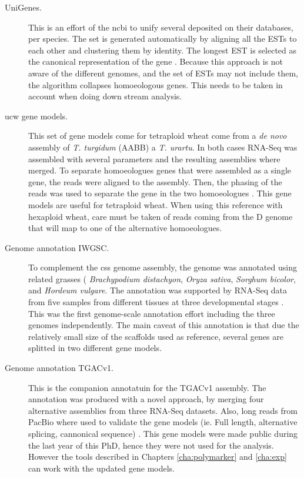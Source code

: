 \begin{description}
\item[UniGenes.] This is an effort of the \gls{ncbi} to unify several  deposited on their databases, per species.
The set is generated automatically by aligning all the ESTs to each other and clustering them by identity. 
The longest EST is selected as the canonical representation of the gene \citep{PontiusJUWagnerL2002}. 
Because this approach is not aware of the different genomes, and the set of ESTs may not include them, the algorithm  collapses homoeologous genes. 
This needs to be taken in account when doing down stream analysis. 
\item[\acrshort{ucw} gene models.] This set of gene models come for tetraploid wheat come from a \textit{de novo} assembly of \textit{T. turgidum} (AABB) a \textit{T. urartu}. 
In both cases RNA-Seq was assembled with several parameters and the resulting assemblies where merged. 
To separate homoeologues genes that were assembled as a single gene, the reads were aligned to the assembly.
Then, the phasing of the reads was used to separate the gene in the two homoeologues \citep{Krasileva2013}.
This gene models are useful for tetraploid wheat. 
When using this reference with hexaploid wheat, care must be taken of reads coming from the D genome that will map to one of the alternative homoeologues. 
\item[Genome annotation IWGSC.] To complement the \acrshort{css} genome assembly, the genome was annotated using related grasses ( \textit{Brachypodium distachyon}, \textit{Oryza sativa}, \textit{Sorghum bicolor}, and \textit{Hordeum vulgare}. 
The annotation was supported by RNA-Seq data from five samples from different tissues at three developmental stages \citep{Mayer2014}. 
This was the first genome-scale annotation effort including the three genomes independently. 
The main caveat of this annotation is that due the relatively small size of the scaffolds used as reference, several genes are splitted in two different gene models. 
\item[Genome annotation TGACv1.] This is the companion annotatuin for the TGACv1 assembly. 
The annotation was produced with a novel approach, by merging four alternative assemblies from three RNA-Seq datasets. 
Also, long reads from PacBio where used to validate the gene models (ie. Full length, alternative splicing, cannonical sequence) \citep{Venturini2016}. 
This gene models were made public during the last year of this PhD, hence they were not used for the analysis. 
However the tools described in Chapters \ref{cha:polymarker} and \ref{cha:exp} can work with the updated gene models. 
\end{description}



